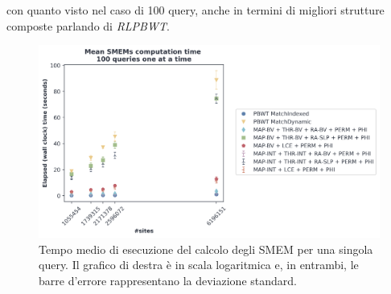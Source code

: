 con quanto visto nel caso di 100 query, anche in termini di migliori strutture
composte parlando di \textit{RLPBWT}.
\begin{figure}
  \centering
  \includegraphics[width=\textwidth]{img/exe_time_single_paper.png}
  \caption{Tempo medio di esecuzione del calcolo degli SMEM per una singola
    query. Il grafico di destra è in scala logaritmica e, in entrambi, le
    barre d'errore rappresentano la deviazione standard.}
  \label{fig:smemsinglechr}
\end{figure}


